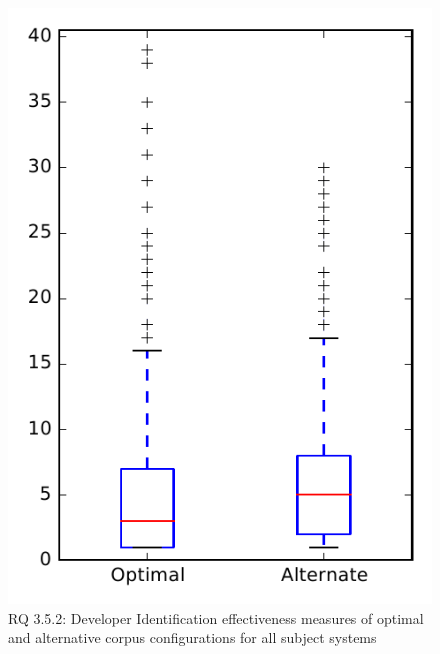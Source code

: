 
\begin{figure}
\centering
\includegraphics[height=0.4\textheight]{figures/combo/dit_rq2_overview}
\caption{RQ 3.5.2: Developer Identification effectiveness measures of optimal and alternative corpus configurations for all subject systems}
\label{fig:combo:dit:rq2:overview}
\end{figure}
